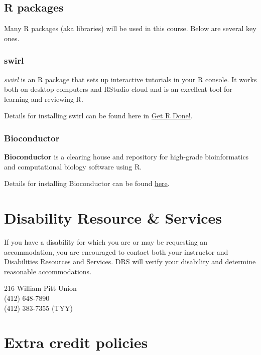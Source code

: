 \documentclass[
]{book}
\begin{document}
\hypertarget{r-packages}{%
\section{R packages}\label{r-packages}}

Many R packages (aka libraries) will be used in this course. Below are several key ones.

\hypertarget{swirl}{%
\subsection{swirl}\label{swirl}}

\emph{swirl} is an R package that sets up interactive tutorials in your R console. It works both on desktop computers and RStudio cloud and is an excellent tool for learning and reviewing R.

Details for installing swirl can be found here in \href{https://brouwern.github.io/getRdone/swirl.html\#swirl}{Get R Done!}.

\hypertarget{bioconductor}{%
\subsection{Bioconductor}\label{bioconductor}}

\textbf{Bioconductor} is a clearing house and repository for high-grade bioinformatics and computational biology software using R.

Details for installing Bioconductor can be found \href{https://brouwern.github.io/lbrb/installing-bioconductor.html}{here}.

\hypertarget{DRS}{%
\chapter{Disability Resource \& Services}\label{DRS}}

If you have a disability for which you are or may be requesting an accommodation, you are encouraged to contact both your instructor and Disabilities Resources and Services. DRS will verify your disability and determine reasonable accommodations.

216 William Pitt Union\\
(412) 648-7890\\
(412) 383-7355 (TYY)

\hypertarget{extracredit}{%
\chapter{Extra credit policies}\label{extracredit}}
\end{document}

